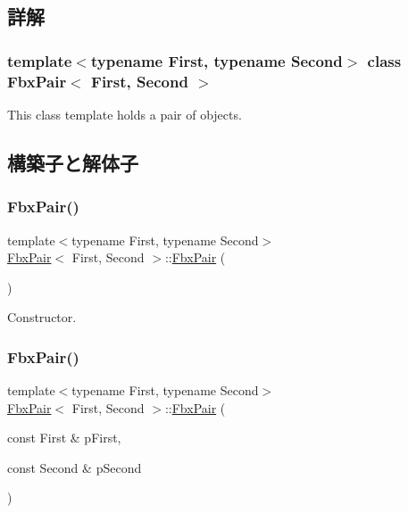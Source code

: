 \subsection{詳解}
\subsubsection*{template$<$typename First, typename Second$>$\newline
class Fbx\+Pair$<$ First, Second $>$}

This class template holds a pair of objects. 

\subsection{構築子と解体子}
\mbox{\label{class_fbx_pair_ae542e6310c76b51c6208724fb18f3b96}} 
\subsubsection{\texorpdfstring{Fbx\+Pair()}{FbxPair()}\hspace{0.1cm}{\footnotesize\ttfamily [1/2]}}
{\footnotesize\ttfamily template$<$typename First, typename Second$>$ \\
\hyperlink{class_fbx_pair}{Fbx\+Pair}$<$ First, Second $>$\+::\hyperlink{class_fbx_pair}{Fbx\+Pair} (\begin{DoxyParamCaption}{ }\end{DoxyParamCaption})}



Constructor. 

\mbox{\label{class_fbx_pair_a7e8efc2156e23d213128de686aba4def}} 
\subsubsection{\texorpdfstring{Fbx\+Pair()}{FbxPair()}\hspace{0.1cm}{\footnotesize\ttfamily [2/2]}}
{\footnotesize\ttfamily template$<$typename First, typename Second$>$ \\
\hyperlink{class_fbx_pair}{Fbx\+Pair}$<$ First, Second $>$\+::\hyperlink{class_fbx_pair}{Fbx\+Pair} (\begin{DoxyParamCaption}\item[{const First \&}]{p\+First,  }\item[{const Second \&}]{p\+Second }\end{DoxyParamCaption})}

